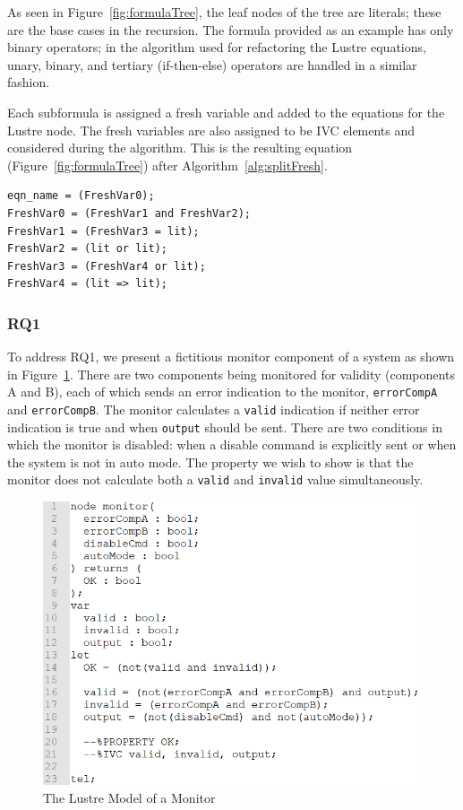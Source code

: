 As seen in Figure~\ref{fig:formulaTree}, the leaf nodes of the tree are literals; these are the base cases in the recursion. The formula provided as an example has only binary operators; in the algorithm used for refactoring the Lustre equations, unary, binary, and tertiary (if-then-else) operators are handled in a similar fashion.

Each subformula is assigned a fresh variable and added to the equations for the Lustre node. The fresh variables are also assigned to be IVC elements and considered during the \aivcalg algorithm. This is the resulting equation (Figure~\ref{fig:formulaTree}) after Algorithm~\ref{alg:splitFresh}.

\begin{verbatim}
eqn_name = (FreshVar0);
FreshVar0 = (FreshVar1 and FreshVar2);
FreshVar1 = (FreshVar3 = lit);
FreshVar2 = (lit or lit);
FreshVar3 = (FreshVar4 or lit);
FreshVar4 = (lit => lit);
\end{verbatim}

\subsubsection{RQ1}
To address RQ1, we present a fictitious monitor component of a system as shown in Figure~\ref{fig:monitorLustre}. There are two components being monitored for validity (components A and B), each of which sends an error indication to the monitor, \texttt{errorCompA} and \texttt{errorCompB}. The monitor calculates  a \texttt{valid} indication if neither error indication is true and when \texttt{output} should be sent. There are two conditions in which the monitor is disabled: when a disable command is explicitly sent or when the system is not in auto mode. The property we wish to show is that the monitor does not calculate both a \texttt{valid} and \texttt{invalid} value simultaneously. 
\begin{figure}[h!]
\begin{center}
\includegraphics[width=.8\textwidth]{images/monitorLustre.PNG}
\caption{The Lustre Model of a Monitor} 
\label{fig:monitorLustre}
\end{center}
\end{figure} 


